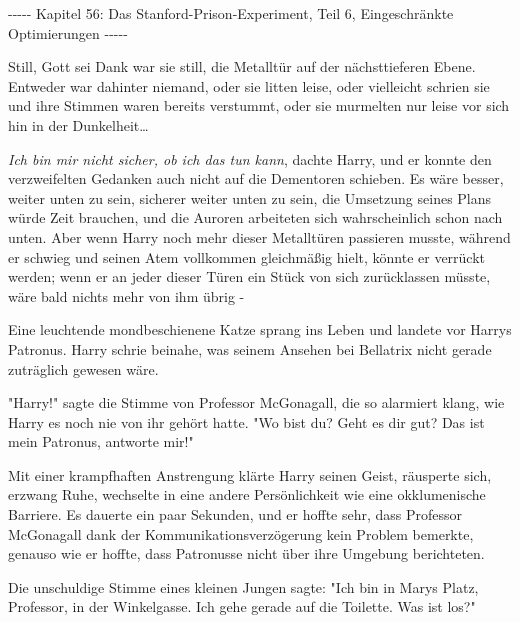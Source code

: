 

\hypertarget{das-stanford-prison-experiment-teil-6-eingeschruxe4nkte-optimierungen}{%

-\/-\/-\/-\/- Kapitel 56: Das Stanford-Prison-Experiment, Teil 6, Eingeschränkte Optimierungen -\/-\/-\/-\/-

Still, Gott sei Dank war sie still, die Metalltür auf der nächsttieferen Ebene. Entweder war dahinter niemand, oder sie litten leise, oder vielleicht schrien sie und ihre Stimmen waren bereits verstummt, oder sie murmelten nur leise vor sich hin in der Dunkelheit…

\emph{Ich bin mir nicht sicher, ob ich das tun kann}, dachte Harry, und er konnte den verzweifelten Gedanken auch nicht auf die Dementoren schieben. Es wäre besser, weiter unten zu sein, sicherer weiter unten zu sein, die Umsetzung seines Plans würde Zeit brauchen, und die Auroren arbeiteten sich wahrscheinlich schon nach unten. Aber wenn Harry noch mehr dieser Metalltüren passieren musste, während er schwieg und seinen Atem vollkommen gleichmäßig hielt, könnte er verrückt werden; wenn er an jeder dieser Türen ein Stück von sich zurücklassen müsste, wäre bald nichts mehr von ihm übrig -

Eine leuchtende mondbeschienene Katze sprang ins Leben und landete vor Harrys Patronus. Harry schrie beinahe, was seinem Ansehen bei Bellatrix nicht gerade zuträglich gewesen wäre.

"Harry!" sagte die Stimme von Professor McGonagall, die so alarmiert klang, wie Harry es noch nie von ihr gehört hatte. "Wo bist du? Geht es dir gut? Das ist mein Patronus, antworte mir!"

Mit einer krampfhaften Anstrengung klärte Harry seinen Geist, räusperte sich, erzwang Ruhe, wechselte in eine andere Persönlichkeit wie eine okklumenische Barriere. Es dauerte ein paar Sekunden, und er hoffte sehr, dass Professor McGonagall dank der Kommunikationsverzögerung kein Problem bemerkte, genauso wie er hoffte, dass Patronusse nicht über ihre Umgebung berichteten.

Die unschuldige Stimme eines kleinen Jungen sagte: "Ich bin in Marys Platz, Professor, in der Winkelgasse. Ich gehe gerade auf die Toilette. Was ist los?"

}
